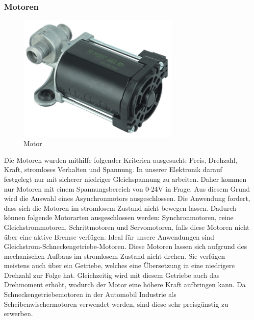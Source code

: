 \subsubsection{Motoren}
\begin{figure}[H] 
\begin{center}

\includegraphics[width=8cm]{Bilder/Bauteile/Motor}
\caption{Motor}
\label{Motor}

\end{center}
\end{figure}
Die Motoren wurden mithilfe folgender Kriterien ausgesucht: Preis, Drehzahl, Kraft, stromloses Verhalten und Spannung.
In unserer Elektronik darauf festgelegt nur mit sicherer niedriger Gleichspannung zu arbeiten. Daher kommen nur Motoren mit einem Spannungsbereich von 0-24V in Frage. Aus diesem Grund wird die Auswahl eines Asynchronmotors ausgeschlossen. Die Anwendung fordert, dass sich die Motoren im stromlosem Zustand nicht bewegen lassen. Dadurch können folgende Motorarten ausgeschlossen werden: Synchronmotoren, reine Gleichstrommotoren, Schrittmotoren und Servomotoren, falls diese Motoren nicht über eine aktive Bremse verfügen. Ideal für unsere Anwendungen sind Gleichstrom-Schneckengetriebe-Motoren. Diese Motoren lassen sich aufgrund des mechanischen Aufbaus im stromlosem Zustand nicht drehen. Sie verfügen meistens auch über ein Getriebe, welches eine Übersetzung in eine niedrigere Drehzahl zur Folge hat. Gleichzeitig wird mit diesem Getriebe auch das Drehmoment erhöht, wodurch der Motor eine höhere Kraft aufbringen kann. Da Schneckengetriebemotoren in der Automobil Industrie als Scheibenwischermotoren verwendet werden, sind diese sehr preisgünstig zu erwerben.

